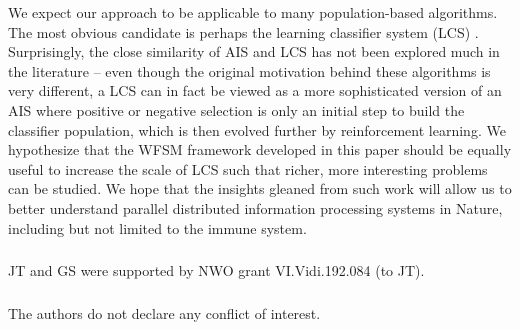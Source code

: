 \documentclass{llncs}
\begin{document}
We expect our approach to be applicable to many population-based algorithms. The most obvious candidate is perhaps the learning classifier system (LCS) \cite{Urbanowicz2009}. Surprisingly, the close similarity of AIS and LCS has not been explored much in the literature -- even though the original motivation behind these algorithms is very different, a LCS can in fact be viewed as a more sophisticated version of an AIS where positive or negative selection is only an initial step to build the classifier population, which is then evolved further by reinforcement learning. We hypothesize that the WFSM framework developed in this paper should be equally useful to increase the scale of LCS such that richer, more interesting problems can be studied. We hope that the insights gleaned from such work will allow us to better understand 
parallel distributed information processing systems in Nature, including but not limited to the immune 
system.


\begin{credits}
  \subsubsection*{\ackname}
  JT and GS were supported by NWO grant VI.Vidi.192.084 (to JT).
  \subsubsection*{\discintname}
  The authors do not declare any conflict of interest.
\end{credits}


\end{document}
